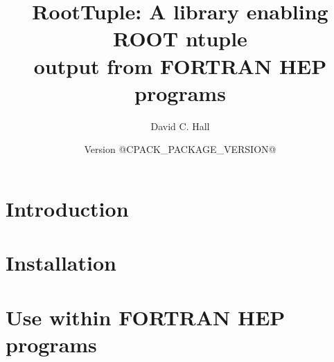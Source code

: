 \documentclass[a4paper]{article}
\begin{document}
\title{RootTuple: A library enabling ROOT ntuple \\output from FORTRAN HEP programs}
\author{David C. Hall}
\date{Version @CPACK_PACKAGE_VERSION@}
\maketitle

\tableofcontents
\newpage

\section{Introduction}

\section{Installation}

\section{Use within FORTRAN HEP programs}
\end{document}
